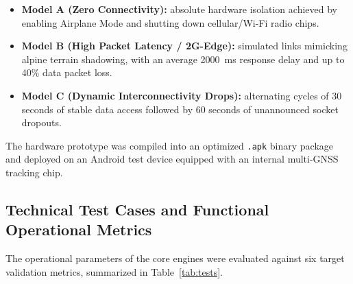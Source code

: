 \documentclass[12pt,a4paper,oneside]{report}
\begin{document}
\begin{itemize}[leftmargin=1.4em]
  \item \textbf{Model A (Zero Connectivity):} absolute hardware isolation achieved by
        enabling Airplane Mode and shutting down cellular/Wi-Fi radio chips.
  \item \textbf{Model B (High Packet Latency / 2G-Edge):} simulated links mimicking alpine
        terrain shadowing, with an average 2000~ms response delay and up to 40\% data
        packet loss.
  \item \textbf{Model C (Dynamic Interconnectivity Drops):} alternating cycles of 30
        seconds of stable data access followed by 60 seconds of unannounced socket dropouts.
\end{itemize}

The hardware prototype was compiled into an optimized \texttt{.apk} binary package and
deployed on an Android test device equipped with an internal multi-GNSS tracking chip.

\subsection{Technical Test Cases and Functional Operational Metrics}

The operational parameters of the core engines were evaluated against six target
validation metrics, summarized in Table~\ref{tab:tests}.
\end{document}
